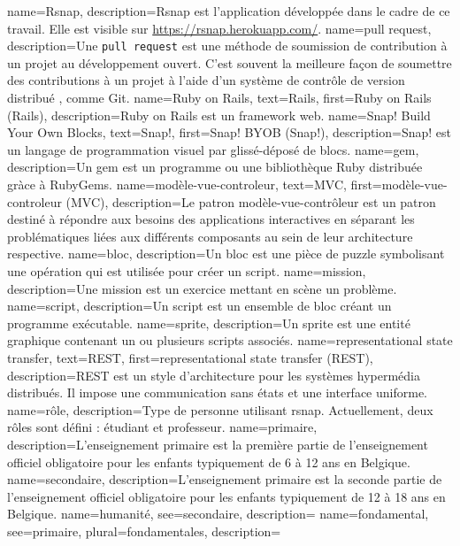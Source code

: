 

{
 name=Rsnap,
 description={Rsnap \cite{rsnap} est l'application développée dans le cadre de ce travail. Elle est visible sur \url{https://rsnap.herokuapp.com/}.}
}
{
 name={pull request},
 description={Une \texttt{pull request} est une méthode de soumission de contribution à un projet au développement ouvert. C'est  souvent la meilleure façon de soumettre des contributions à un projet à l'aide d'un système de contrôle de version distribué , comme Git.}
}
{
 name={Ruby on Rails},
 text={Rails},
 first={Ruby on Rails (Rails)},
 description={Ruby on Rails \cite{rails} est un framework web.}
}
{
 name={Snap! Build Your Own Blocks},
 text={Snap!},
 first={Snap! BYOB (Snap!)},
 description={Snap! \cite{snap} est un langage de programmation visuel par glissé-déposé de \glspl{bloc}.}
}
{
 name={gem},
 description={Un gem \cite{gem} est un programme ou une bibliothèque Ruby distribuée gràce à RubyGems.}
}
{
 name={modèle-vue-controleur},
 text={MVC},
 first={modèle-vue-controleur (MVC)},
 description={Le patron modèle-vue-contrôleur \cite{wiki-mvc} est un patron destiné à répondre aux besoins des applications interactives en séparant les problématiques liées aux différents composants au sein de leur architecture respective.}
}
{
 name={bloc},
 description={Un bloc est une pièce de puzzle symbolisant une opération qui est utilisée pour créer un \gls{script}.}
}
{
 name={mission},
 description={Une mission est un exercice mettant en scène un problème.}
}
{
 name={script},
 description={Un script est un ensemble de bloc créant un programme exécutable.}
}
{
 name={sprite},
 description={Un sprite est une entité graphique contenant un ou plusieurs scripts associés.}
}
{
 name={representational state transfer},
 text={REST},
 first={representational state transfer (REST)},
 description={REST est un style d’architecture pour les systèmes hypermédia distribués. Il impose une communication sans états et une interface uniforme.}
}
{
 name={rôle},
 description={Type de personne utilisant \gls{rsnap}. Actuellement, deux rôles sont défini : étudiant et professeur.}
}
{
 name={primaire},
 description={L'enseignement primaire est la première partie de l'enseignement officiel obligatoire pour les enfants typiquement de 6 à 12 ans en Belgique.}
}
{
 name={secondaire},
 description={L'enseignement primaire est la seconde partie de l'enseignement officiel obligatoire pour les enfants typiquement de 12 à 18 ans en Belgique.}
}
{
 name={humanité},
 see=secondaire,
 description={}
}
{
 name={fondamental},
 see=primaire,
 plural={fondamentales},
 description={}
}
